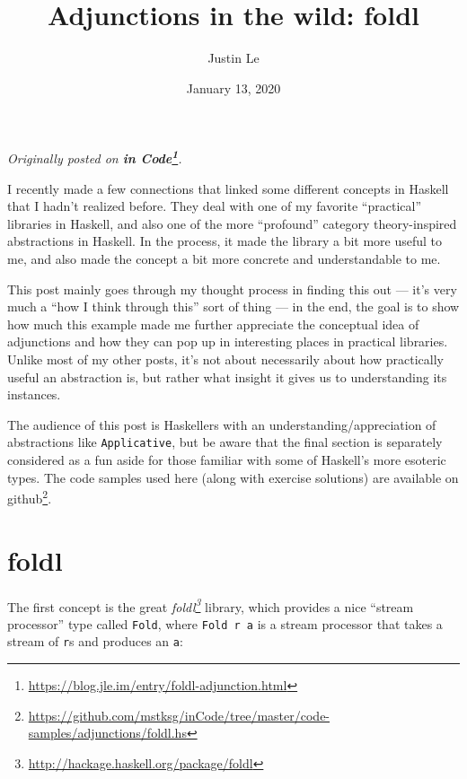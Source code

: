 \documentclass[]{article}
\title{Adjunctions in the wild: foldl}
\author{Justin Le}
\date{January 13, 2020}
\renewcommand{\href}[2]{#2\footnote{\url{#1}}}
\begin{document}
\maketitle

\emph{Originally posted on
\textbf{\href{https://blog.jle.im/entry/foldl-adjunction.html}{in Code}}.}

I recently made a few connections that linked some different concepts in Haskell
that I hadn't realized before. They deal with one of my favorite ``practical''
libraries in Haskell, and also one of the more ``profound'' category
theory-inspired abstractions in Haskell. In the process, it made the library a
bit more useful to me, and also made the concept a bit more concrete and
understandable to me.

This post mainly goes through my thought process in finding this out --- it's
very much a ``how I think through this'' sort of thing --- in the end, the goal
is to show how much this example made me further appreciate the conceptual idea
of adjunctions and how they can pop up in interesting places in practical
libraries. Unlike most of my other posts, it's not about necessarily about how
practically useful an abstraction is, but rather what insight it gives us to
understanding its instances.

The audience of this post is Haskellers with an understanding/appreciation of
abstractions like \texttt{Applicative}, but be aware that the final section is
separately considered as a fun aside for those familiar with some of Haskell's
more esoteric types. The code samples used here (along with exercise solutions)
are
\href{https://github.com/mstksg/inCode/tree/master/code-samples/adjunctions/foldl.hs}{available
on github}.

\hypertarget{foldl}{%
\section{foldl}\label{foldl}}

The first concept is the great
\emph{\href{http://hackage.haskell.org/package/foldl}{foldl}} library, which
provides a nice ``stream processor'' type called \texttt{Fold}, where
\texttt{Fold\ r\ a} is a stream processor that takes a stream of \texttt{r}s and
produces an \texttt{a}:
\end{document}
